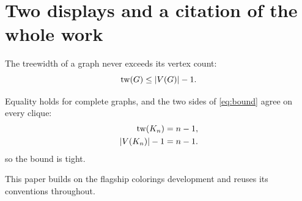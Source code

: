 \section{Two displays and a citation of the whole work}

The treewidth of a graph never exceeds its vertex count:
\begin{equation}
  \operatorname{tw}(G) \le |V(G)| - 1.
  \label{eq:bound}
\end{equation}

Equality holds for complete graphs, and the two sides of \eqref{eq:bound}
agree on every clique:
\begin{align}
  \operatorname{tw}(K_n) &= n - 1, \\
  |V(K_n)| - 1 &= n - 1.
\end{align}
so the bound is tight.

This paper builds on
the flagship colorings development
and reuses its conventions throughout.
